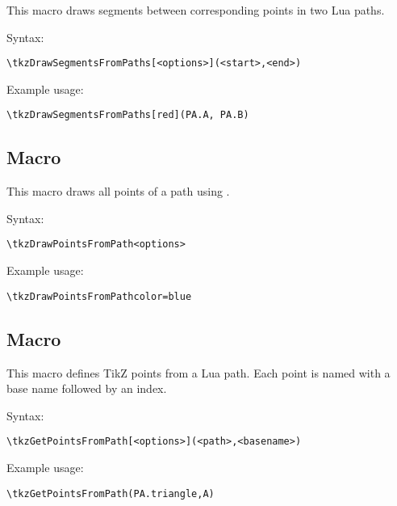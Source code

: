 This macro draws segments between corresponding points in two Lua paths.

\medskip
\noindent
Syntax:

\begin{verbatim}
\tkzDrawSegmentsFromPaths[<options>](<start>,<end>)
\end{verbatim}

\noindent
Example usage:

\begin{mybox}
\begin{verbatim}
\tkzDrawSegmentsFromPaths[red](PA.A, PA.B)
\end{verbatim}
\end{mybox}

\subsection{Macro }
\label{sub:macro_tkzDrawPointsFromPath}

This macro draws all points of a path using .

\medskip
\noindent
Syntax:

\begin{verbatim}
\tkzDrawPointsFromPath<options>
\end{verbatim}

\noindent
Example usage:

\begin{mybox}
\begin{verbatim}
\tkzDrawPointsFromPathcolor=blue
\end{verbatim}
\end{mybox}

\subsection{Macro }
This macro defines TikZ points from a Lua path. Each point is named with a base name followed by an index.

\medskip
\noindent
Syntax:

\begin{verbatim}
\tkzGetPointsFromPath[<options>](<path>,<basename>)
\end{verbatim}

\noindent
Example usage:

\begin{mybox}
\begin{verbatim}
\tkzGetPointsFromPath(PA.triangle,A)
\end{verbatim}
\end{mybox}

